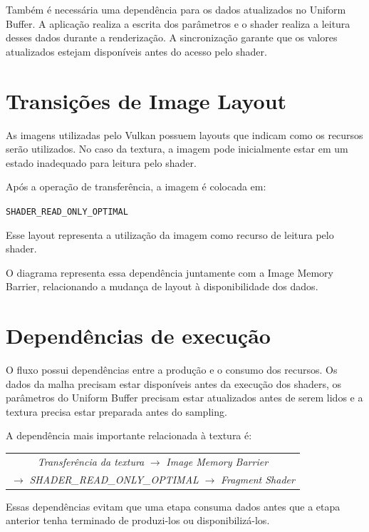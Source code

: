 Também é necessária uma dependência para os dados atualizados no Uniform
Buffer. A aplicação realiza a escrita dos parâmetros e o shader realiza a
leitura desses dados durante a renderização. A sincronização garante que os
valores atualizados estejam disponíveis antes do acesso pelo shader.

\section{Transições de Image Layout}

As imagens utilizadas pelo Vulkan possuem layouts que indicam como os
recursos serão utilizados. No caso da textura, a imagem pode inicialmente
estar em um estado inadequado para leitura pelo shader.

Após a operação de transferência, a imagem é colocada em:

\begin{center}
\texttt{SHADER\_READ\_ONLY\_OPTIMAL}
\end{center}

Esse layout representa a utilização da imagem como recurso de leitura pelo
shader.

O diagrama representa essa dependência juntamente com a Image Memory
Barrier, relacionando a mudança de layout à disponibilidade dos dados.

\section{Dependências de execução}

O fluxo possui dependências entre a produção e o consumo dos recursos. Os
dados da malha precisam estar disponíveis antes da execução dos shaders, os
parâmetros do Uniform Buffer precisam estar atualizados antes de serem lidos
e a textura precisa estar preparada antes do sampling.

A dependência mais importante relacionada à textura é:

\begin{center}
\begin{tabular}{c}
\textit{Transferência da textura}
$\rightarrow$
\textit{Image Memory Barrier}
\\[0.2cm]
$\rightarrow$
\textit{SHADER\_READ\_ONLY\_OPTIMAL}
$\rightarrow$
\textit{Fragment Shader}
\end{tabular}
\end{center}

Essas dependências evitam que uma etapa consuma dados antes que a etapa
anterior tenha terminado de produzi-los ou disponibilizá-los.


